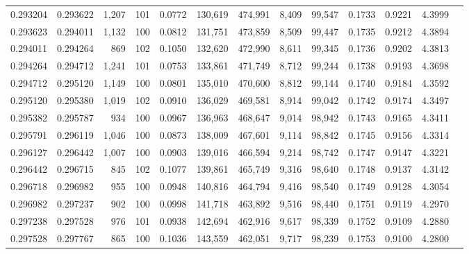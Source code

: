 \begin{tabular}{rrrrrrrrrrrrr}
0.293204 & 0.293622 & 1,207 & 101 &                                     0.0772 & 130,619 & 474,991 &   8,409 &  99,547 & 0.1733 & 0.9221 & 4.3999 \\
0.293623 & 0.294011 & 1,132 & 100 &                                     0.0812 & 131,751 & 473,859 &   8,509 &  99,447 & 0.1735 & 0.9212 & 4.3894 \\
0.294011 & 0.294264 &   869 & 102 &                                     0.1050 & 132,620 & 472,990 &   8,611 &  99,345 & 0.1736 & 0.9202 & 4.3813 \\
0.294264 & 0.294712 & 1,241 & 101 &                                     0.0753 & 133,861 & 471,749 &   8,712 &  99,244 & 0.1738 & 0.9193 & 4.3698 \\
0.294712 & 0.295120 & 1,149 & 100 &                                     0.0801 & 135,010 & 470,600 &   8,812 &  99,144 & 0.1740 & 0.9184 & 4.3592 \\
0.295120 & 0.295380 & 1,019 & 102 &                                     0.0910 & 136,029 & 469,581 &   8,914 &  99,042 & 0.1742 & 0.9174 & 4.3497 \\
0.295382 & 0.295787 &   934 & 100 &                                     0.0967 & 136,963 & 468,647 &   9,014 &  98,942 & 0.1743 & 0.9165 & 4.3411 \\
0.295791 & 0.296119 & 1,046 & 100 &                                     0.0873 & 138,009 & 467,601 &   9,114 &  98,842 & 0.1745 & 0.9156 & 4.3314 \\
0.296127 & 0.296442 & 1,007 & 100 &                                     0.0903 & 139,016 & 466,594 &   9,214 &  98,742 & 0.1747 & 0.9147 & 4.3221 \\
0.296442 & 0.296715 &   845 & 102 &                                     0.1077 & 139,861 & 465,749 &   9,316 &  98,640 & 0.1748 & 0.9137 & 4.3142 \\
0.296718 & 0.296982 &   955 & 100 &                                     0.0948 & 140,816 & 464,794 &   9,416 &  98,540 & 0.1749 & 0.9128 & 4.3054 \\
0.296982 & 0.297237 &   902 & 100 &                                     0.0998 & 141,718 & 463,892 &   9,516 &  98,440 & 0.1751 & 0.9119 & 4.2970 \\
0.297238 & 0.297528 &   976 & 101 &                                     0.0938 & 142,694 & 462,916 &   9,617 &  98,339 & 0.1752 & 0.9109 & 4.2880 \\
0.297528 & 0.297767 &   865 & 100 &                                     0.1036 & 143,559 & 462,051 &   9,717 &  98,239 & 0.1753 & 0.9100 & 4.2800 \\

\end{tabular}
